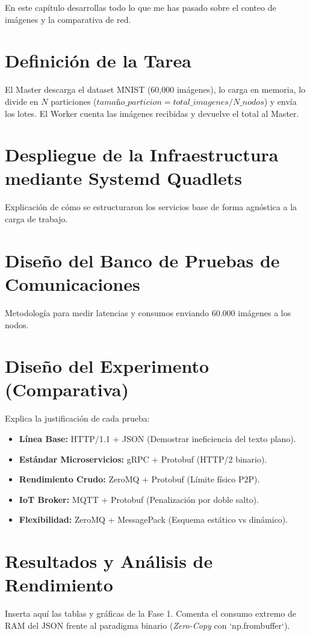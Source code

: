 \documentclass[11pt, a4paper]{report}
\begin{document}
En este capítulo desarrollas todo lo que me has pasado sobre el conteo de imágenes y la comparativa de red.

\section{Definición de la Tarea}
El Master descarga el dataset MNIST (60,000 imágenes), lo carga en memoria, lo divide en $N$ particiones ($tamaño\_particion = total\_imagenes / N\_nodos$) y envía los lotes. El Worker cuenta las imágenes recibidas y devuelve el total al Master.

\section{Despliegue de la Infraestructura mediante Systemd Quadlets}
Explicación de cómo se estructuraron los servicios base de forma agnóstica a la carga de trabajo.

\section{Diseño del Banco de Pruebas de Comunicaciones}
Metodología para medir latencias y consumos enviando 60.000 imágenes a los nodos.

\section{Diseño del Experimento (Comparativa)}
Explica la justificación de cada prueba:
\begin{itemize}
    \item \textbf{Línea Base:} HTTP/1.1 + JSON (Demostrar ineficiencia del texto plano).
    \item \textbf{Estándar Microservicios:} gRPC + Protobuf (HTTP/2 binario).
    \item \textbf{Rendimiento Crudo:} ZeroMQ + Protobuf (Límite físico P2P).
    \item \textbf{IoT Broker:} MQTT + Protobuf (Penalización por doble salto).
    \item \textbf{Flexibilidad:} ZeroMQ + MessagePack (Esquema estático vs dinámico).
\end{itemize}

\section{Resultados y Análisis de Rendimiento}
Inserta aquí las tablas y gráficas de la Fase 1. Comenta el consumo extremo de RAM del JSON frente al paradigma binario (\textit{Zero-Copy} con `np.frombuffer`).
\end{document}

